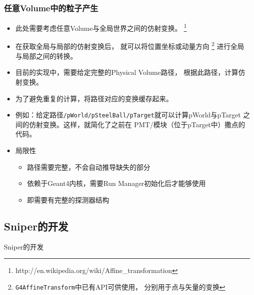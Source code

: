 \begin{frame}
    \frametitle{任意Volume中的粒子产生}
    \begin{itemize}
        \item 此处需要考虑任意Volume与全局世界之间的仿射变换。
                \footnote{http://en.wikipedia.org/wiki/Affine\_transformation}
        \item 在获取全局与局部的仿射变换后，
              就可以将位置坐标或动量方向
              \footnote{{\tt G4AffineTransform}中已有API可供使用，
                        分别用于点与矢量的变换}
              进行全局与局部之间的转换。
        \item 目前的实现中，需要给定完整的Physical Volume路径，
              根据此路径，计算仿射变换。
        \item 为了避免重复的计算，将路径对应的变换缓存起来。
        \item 例如：给定路径{\tt /pWorld/pSteelBall/pTarget}就可以计算pWorld与pTarget
              之间的仿射变换。这样，就简化了之前在
              PMT/模块（位于pTarget中）撒点的代码。
        \item 局限性
            \begin{itemize}
                \item 路径需要完整，不会自动推导缺失的部分
                \item 依赖于Geant4内核，需要Run Manager初始化后才能够使用
                \item 即需要有完整的探测器结构
            \end{itemize}
    \end{itemize}
\end{frame}

\subsection{Sniper的开发}

\begin{frame}
    \begin{center}
        \Large Sniper的开发
    \end{center}
\end{frame}

